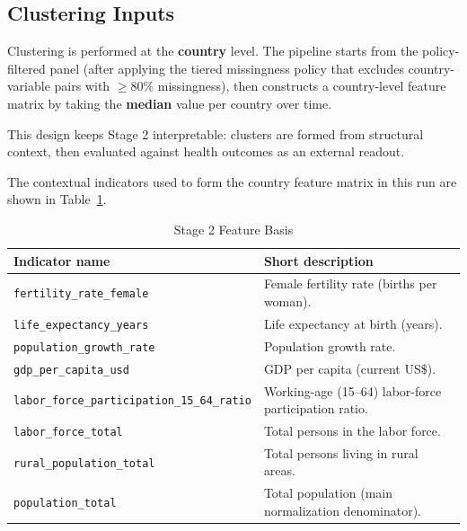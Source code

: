 \documentclass[a4paper]{report}
\begin{document}
\subsection{Clustering Inputs}
Clustering is performed at the \textbf{country} level.
The pipeline starts from the policy-filtered panel (after applying the tiered missingness policy that excludes country-variable pairs with $\geq$80\% missingness), then constructs a country-level feature matrix by taking the \textbf{median} value per country over time.

This design keeps Stage 2 interpretable: clusters are formed from structural context, then evaluated against health outcomes as an external readout.

The contextual indicators used to form the country feature matrix in this run are shown in Table~\ref{tab:stage2-feature-basis}.

\begin{table}[h]
    \centering
    \caption{Stage 2 Feature Basis}
    \label{tab:stage2-feature-basis}
    \begin{tabular}{|p{}|p{}|}
        \hline
        \textbf{Indicator name} & \textbf{Short description} \\
        \hline
        \texttt{fertility\_rate\_female} & Female fertility rate (births per woman). \\
        \hline
        \texttt{life\_expectancy\_years} & Life expectancy at birth (years). \\
        \hline
        \texttt{population\_growth\_rate} & Population growth rate. \\
        \hline
        \texttt{gdp\_per\_capita\_usd} & GDP per capita (current US\$). \\
        \hline
        \texttt{labor\_force\_participation\_15\_64\_ratio} & Working-age (15--64) labor-force participation ratio. \\
        \hline
        \texttt{labor\_force\_total} & Total persons in the labor force. \\
        \hline
        \texttt{rural\_population\_total} & Total persons living in rural areas. \\
        \hline
        \texttt{population\_total} & Total population (main normalization denominator). \\
        \hline
    \end{tabular}
\end{table}
\end{document}
